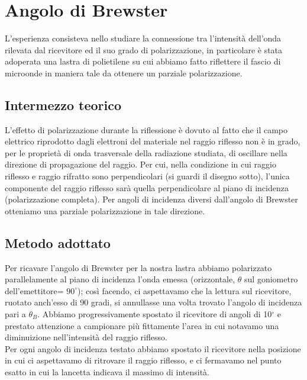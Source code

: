 \documentclass{article}
\theoremstyle{definition}
\begin{document}
\section{Angolo di Brewster}%
L'esperienza consisteva nello studiare la connessione tra l'intensità dell'onda rilevata dal ricevitore ed il suo grado di polarizzazione, in particolare è stata adoperata una lastra di polietilene su cui abbiamo fatto riflettere il fascio di microonde in maniera tale da ottenere un parziale polarizzazione.\\
\subsection{Intermezzo teorico}%

L'effetto di polarizzazione durante la riflessione è dovuto al fatto che il campo elettrico riprodotto dagli elettroni del materiale nel raggio riflesso non è in grado, per le proprietà di onda trasversale della radiazione studiata, di oscillare nella direzione di propagazione del raggio. Per cui, nella condizione in cui raggio riflesso e raggio rifratto sono perpendicolari (si guardi il disegno sotto), l'unica componente del raggio riflesso sarà quella perpendicolare al piano di incidenza (polarizzazione completa). Per angoli di incidenza diversi dall'angolo di Brewster otteniamo una parziale polarizzazione in tale direzione.

\begin{figure}[!ht]
    	\captionsetup{labelformat=empty}

\end{figure}

\subsection{Metodo adottato}
Per ricavare l'angolo di Brewster per la nostra lastra abbiamo polarizzato parallelamente al piano di incidenza l'onda emessa (orizzontale, \(\theta\) sul goniometro dell'emettitore= \(90^{\circ}\)); così facendo, ci aspettavamo che la lettura sul ricevitore, ruotato anch'esso di 90 gradi, si annullasse una volta trovato l'angolo di incidenza pari a \(\theta_{B}\). Abbiamo progressivamente spostato il ricevitore di angoli di 10\(^{\circ}\) e prestato attenzione a campionare più fittamente l'area in cui notavamo una diminuizione nell'intensità del raggio riflesso.\\
Per ogni angolo di incidenza testato abbiamo spostato il ricevitore nella posizione in cui ci aspettavamo di ritrovare il raggio riflesso, e ci fermavamo nel punto esatto in cui la lancetta indicava il massimo di intensità.\\
\end{document}
